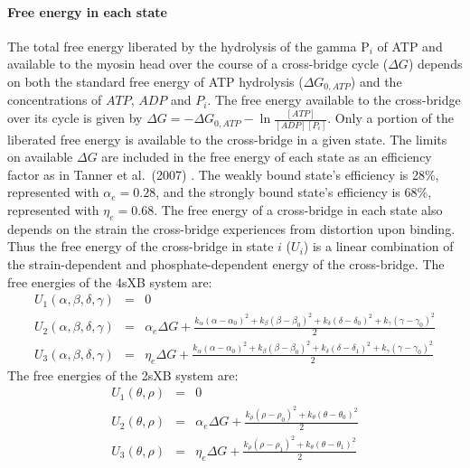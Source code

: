 \documentclass[10pt]{article}
\newcommand{\citep}[1]{\cite{#1}} %
\begin{document}
\paragraph{Free energy in each state} %
The total free energy liberated by the hydrolysis of the gamma P$_i$ of ATP and available to the myosin head over the course of a cross-bridge cycle ($\Delta G$) depends on both the standard free energy of ATP hydrolysis ($\Delta G_{0,ATP}$) and the concentrations of $ATP$, $ADP$ and $P_i$. 
The free energy available to the cross-bridge over its cycle is given by $\Delta G = -\Delta G_{0,ATP} - \ln \frac{[ATP]}{[ADP] [P_i]}$. 
Only a portion of the liberated free energy is available to the cross-bridge in a given state.
The limits on available $\Delta G$ are included in the free energy of each state as an efficiency factor as in Tanner et al.~(2007) \citep{Pate1989, Tanner2007} .
The weakly bound state's efficiency is 28\%, represented with $\alpha_e=0.28$, and the strongly bound state's efficiency is 68\%, represented with $\eta_e=0.68$. 
The free energy of a cross-bridge in each state also depends on the strain the cross-bridge experiences from distortion upon binding.
Thus the free energy of the cross-bridge in state $i$ ($U_i$) is a linear combination of the strain-dependent and phosphate-dependent energy of the cross-bridge.
The free energies of the 4sXB system are: 
\begin{eqnarray*}
\label{4sEnergy}
U_1(\alpha, \beta, \delta, \gamma) & = & 0 \\
U_2(\alpha, \beta, \delta, \gamma) & = & \alpha_e \Delta G + \frac{k_\alpha (\alpha-\alpha_0)^2 + k_\beta (\beta-\beta_0)^2 + k_\delta (\delta-\delta_0)^2 + k_\gamma (\gamma-\gamma_0)^2}{2} \\
U_3(\alpha, \beta, \delta, \gamma) & = & \eta_e \Delta G + \frac{k_\alpha (\alpha-\alpha_0)^2 + k_\beta (\beta-\beta_0)^2 + k_\delta (\delta-\delta_1)^2 + k_\gamma (\gamma-\gamma_0)^2}{2} 
\end{eqnarray*}
The free energies of the 2sXB system are: 
\begin{eqnarray*}
\label{2sEnergy}
	U_1(\theta, \rho) & = & 0 \\
    U_2(\theta, \rho) & = & \alpha_e \Delta G + \frac{k_\rho (\rho - \rho_0)^2 + 
                          k_\theta (\theta - \theta_0)^2}{2} \\
    U_3(\theta, \rho) & = & \eta_e \Delta G   + \frac{k_\rho (\rho - \rho_1)^2 + 
                          k_\theta (\theta - \theta_1)^2}{2} 
\end{eqnarray*}
\end{document}
